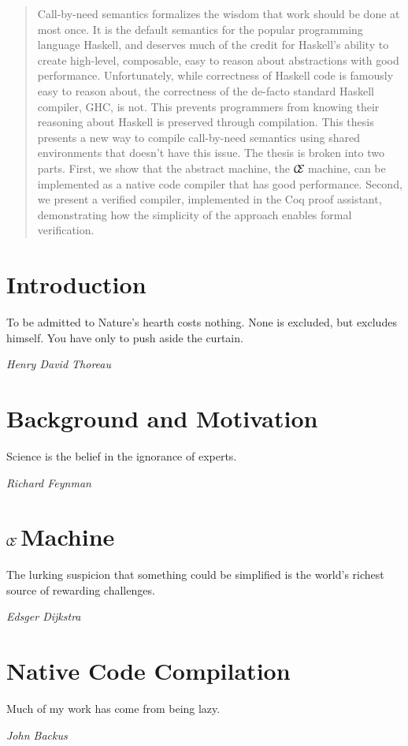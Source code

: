 \documentclass[botnum, fleqn]{unmeethesis}
\def\ce{$\mathcal{\mathcal{C} \mskip -4mu \mathcal{E}} \mskip 4mu$}
\begin{document}
\begin{abstract}
Call-by-need semantics formalizes the wisdom that work should be done at most
once. It is the default semantics for the popular programming language Haskell,
and deserves much of the credit for Haskell's ability to create high-level,
composable, easy to reason about abstractions with good performance.
Unfortunately, while correctness of Haskell code is famously easy to reason
about, the correctness of the de-facto standard Haskell compiler, GHC, is not.
This prevents programmers from knowing their reasoning about Haskell is
preserved through compilation. This thesis presents a new way to compile
call-by-need semantics using shared environments that doesn't have this issue.
The thesis is broken into two parts. First, we show that the abstract machine,
the \ce machine, can be implemented as a native code compiler that has good
performance. Second, we present a verified compiler, implemented in the Coq
proof assistant, demonstrating how the simplicity of the approach enables formal
verification. 
\clearpage %
\end{abstract}

\tableofcontents
\listoffigures

\mainmatter

\chapter{Introduction}\label{chap:intro}
\epigraph{To be admitted to Nature's hearth costs nothing. None is excluded, but
excludes himself. You have only to push aside the curtain.}{\textit{Henry David
Thoreau}}


\chapter{Background and Motivation}\label{chap:background}
\epigraph{Science is the belief in the ignorance of experts.}{\textit{Richard
Feynman}}


\chapter{\ce Machine}\label{chap:ce}
\epigraph{The lurking suspicion that something could be simplified is the
world's richest source of rewarding challenges.}{\textit{Edsger Dijkstra}}




\chapter{Native Code Compilation}\label{chap:cem}
\epigraph{Much of my work has come from being lazy.}{\textit{John Backus}}





\end{document}
